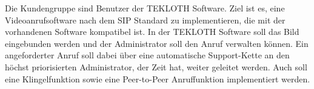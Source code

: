 Die Kundengruppe sind Benutzer der TEKLOTH Software.
Ziel ist es, eine Videoanrufsoftware nach dem SIP Standard zu implementieren, die mit der vorhandenen Software kompatibel ist.
In der TEKLOTH Software soll das Bild eingebunden werden und der Administrator soll den Anruf verwalten können.
Ein angeforderter Anruf soll dabei über eine automatische Support-Kette an den höchst priorisierten Administrator, der Zeit hat, weiter geleitet werden.
Auch soll eine Klingelfunktion sowie eine Peer-to-Peer Anruffunktion implementiert werden.
